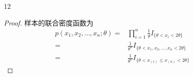 \documentclass[normal,founder,mtpro2,cn]{elegantnote}
\begin{document}
\begin{enumerate}
\begin{proof}
\begin{enumerate}
                      由因子分解定理有，$T=\sum_{i=1}^{n}\left(x_{i}-\mu\right)^{2}$ 为 $\sigma^{2}$ 的充分统计量。
                \item 在 $\sigma^2$ 已知时，样本联合密度函数为
                      \begin{equation*}
                          \begin{aligned}
                              p_{1}\left(x_{1},x_{2},\ldots,x_{n};\mu\right)= & \prod_{i=1}^{n}\frac{1}{\sqrt{2\pi}\sigma}\exp\left(\frac{\left(x_{i}-\mu\right)^{2}}{2\sigma^{2}}\right)                                                                               \\
                              =                                               & \frac{1}{(\sqrt{2\pi}\sigma)^{n}}\exp\left(-\frac{1}{2\sigma^{2}}\sum_{i=1}^{n}\left(x_{i}^{2}-2\mu x_{i}+\mu^{2}\right)\right)                                                         \\
                              =                                               & \frac{1}{(\sqrt{2\pi}\sigma)^{n}}\exp\left(-\frac{\sum_{i=1}^{n}x_{i}^{2}}{2\sigma^{2}}\right)\cdot\exp\left[-\frac{1}{2\sigma^{2}}\left(n\mu^{2}-2\mu\sum_{i=1}^{n}x_{i}\right)\right]
                          \end{aligned}
                      \end{equation*}

                      令
                      \begin{gather*}
                          T=\sum_{i=1}^{n}x_{i},\quad g\left(t;\mu\right)=\exp\left[-\frac{1}{2\sigma^{2}}\left(n\mu^{2}-2\mu t\right)\right], \\
                          h\left(x_{1},x_{2},\ldots,x_{n}\right)=\frac{1}{(\sqrt{2\pi}\sigma)^{n}}\exp\left(-\frac{\sum_{i=1}^{n}x_{i}^{2}}{2\sigma^{2}}\right).
                      \end{gather*}

                      由因子分解定理有，$T=\sum_{i=1}^{n}x_{i}$ 为 $\mu$ 的充分统计量。
            \end{enumerate}
        \end{proof}
    \item[12]
        \begin{proof}
            样本的联合密度函数为
            \begin{equation*}
                \begin{aligned}
                    p\left(x_{1},x_{2},\ldots,x_{n};\theta\right)= & \prod_{i=1}^{n}\frac{1}{\theta}I_{\{\theta<x_{i}<2\theta\}}         \\
                    =                                              & \frac{1}{\theta^{n}}I_{\{\theta<x_{1},x_{2},\ldots,x_{n}<2\theta\}} \\
                    =                                              & \frac{1}{\theta^{n}}I_{\{\theta<x_{(1)}\leq x_{(n)}<2\theta\}}
                \end{aligned}
            \end{equation*}


\end{proof}
\end{enumerate}
\end{document}
